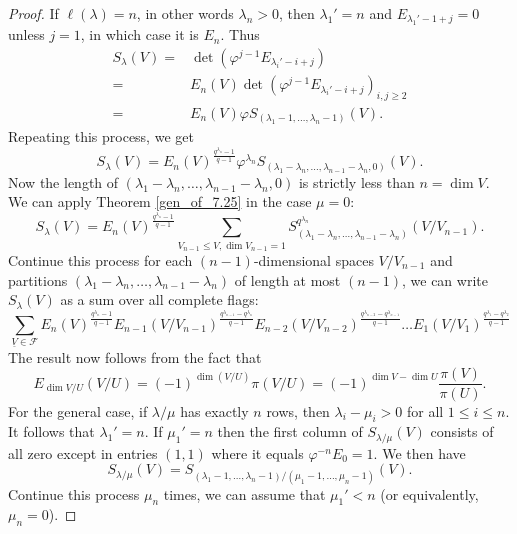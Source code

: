 \documentclass[10pt,a4paper]{amsart}
\begin{document}
\begin{proof}
If $\ell (\lambda) = n$, in other words $\lambda_n > 0$, then $\lambda_1' = n$ and $E_{\lambda_1' - 1+j} = 0$ unless $j=1$, in which case it is $E_n$. Thus 
\begin{align*}
S_{\lambda}(V) =& \det (\varphi^{j-1} E_{\lambda_i' - i +j})\\
=&  E_n (V) \det (\varphi^{j-1} E_{\lambda_i' - i +j})_{i,j \geq 2}\\
=& E_n (V) \varphi S_{(\lambda_1-1, \ldots, \lambda_n-1)} (V). 
\end{align*}
Repeating this process, we get 
\begin{equation*}
S_{\lambda} (V) = E_n(V)^{\frac{q^{\lambda_n}-1}{q-1}} \varphi^{\lambda_n} S_{(\lambda_1 - \lambda_n, \ldots, \lambda_{n-1}-\lambda_n, 0)} (V). 
\end{equation*}
Now the length of $(\lambda_1 - \lambda_n, \ldots, \lambda_{n-1} - \lambda_n,0)$ is strictly less than $n = \dim V$. We can apply Theorem \ref{gen_of_7.25} in the case $\mu = 0$: 
\begin{equation*}
S_{\lambda} (V) =  E_n(V)^{\frac{q^{\lambda_n}-1}{q-1}} \sum_{V_{n-1} \leq V, \dim V_{n-1} =1} S_{(\lambda_1 - \lambda_n, \ldots, \lambda_{n-1} - \lambda_n)}^{q^{\lambda_n}} (V/V_{n-1}).
\end{equation*}
Continue this process for each $(n-1)$-dimensional spaces $V/V_{n-1}$ and partitions $(\lambda_1- \lambda_n, \ldots, \lambda_{n-1}-\lambda_n)$ of length at most $(n-1)$, we can write $S_{\lambda}(V)$ as a sum over all complete flags: 
\begin{equation*}
\sum_{\underline{V} \in \mathcal{F}} E_{n}(V)^{\frac{q^{\lambda_n}-1}{q-1}}   E_{n-1}(V/V_{n-1})^{\frac{q^{\lambda_{n-1}} -q^{\lambda_n}}{q-1}}  E_{n-2}(V/V_{n-2})^{\frac{q^{\lambda_{n-2}} -q^{\lambda_{n-1}}}{q-1}}  \ldots E_{1}(V/V_{1})^{\frac{q^{\lambda_{1}}-q^{\lambda_2}}{q-1}}   
\end{equation*}
The result now follows from the fact that
\begin{equation*} 
E_{\dim V/U} (V/U) = (-1)^{\dim (V/U)} \pi (V/U) =(-1)^{\dim V - \dim U} \frac{\pi (V)}{\pi (U)}. 
\end{equation*}
For the general case, if $\lambda/\mu$ has exactly $n$ rows, then $\lambda_i - \mu_i > 0$ for all $1 \leq i \leq n$. It follows that $\lambda_1' = n$. If $\mu_1' = n$ then the first column of $S_{\lambda/\mu} (V)$ consists of all zero except in entries $(1,1)$ where it equals $\varphi^{-n} E_0 = 1$. We then have 
\begin{equation*}
S_{\lambda/\mu} (V) = S_{(\lambda_1-1, \ldots, \lambda_n-1)/(\mu_1-1, \ldots, \mu_n-1)} (V). 
\end{equation*}
Continue this process $\mu_n$ times, we can assume that $\mu_1' <n$ (or equivalently, $\mu_n = 0$).   
\end{proof}
\end{document}

